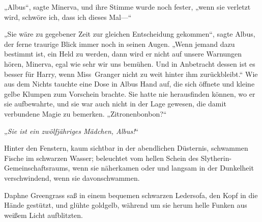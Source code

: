 „Albus“, sagte Minerva, und ihre Stimme wurde noch fester, „wenn sie verletzt wird, schwöre ich, dass ich dieses Mal—“

„Sie wäre zu gegebener Zeit zur gleichen Entscheidung gekommen“, sagte Albus, der ferne traurige Blick immer noch in seinen Augen. „Wenn jemand dazu bestimmt ist, ein Held zu werden, dann wird er nicht auf unsere Warnungen hören, Minerva, egal wie sehr wir uns bemühen. Und in Anbetracht dessen ist es besser für Harry, wenn Miss~Granger nicht zu weit hinter ihm zurückbleibt.“ Wie aus dem Nichts tauchte eine Dose in Albus Hand auf, die sich öffnete und kleine gelbe Klumpen zum Vorschein brachte. Sie hatte nie herausfinden können, wo er sie aufbewahrte, und sie war auch nicht in der Lage gewesen, die damit verbundene Magie zu bemerken. „Zitronenbonbon?“

„\emph{Sie ist ein zwölfjähriges Mädchen, Albus!}“


Hinter den Fenstern, kaum sichtbar in der abendlichen Düsternis, schwammen Fische im schwarzen Wasser; beleuchtet vom hellen Schein des Slytherin-Gemeinschaftsraums, wenn sie näherkamen oder und langsam in der Dunkelheit verschwindend, wenn sie davonschwammen.

Daphne Greengrass saß in einem bequemen schwarzen Ledersofa, den Kopf in die Hände gestützt, und glühte goldgelb, während um sie herum helle Funken aus weißem Licht aufblitzten.

